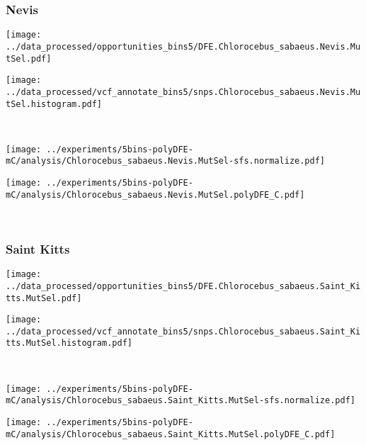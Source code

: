\subsubsection{Nevis}

\begin{minipage}{0.49\linewidth}
    \texttt{[image: ../data\_processed/opportunities\_bins5/DFE.Chlorocebus\_sabaeus.Nevis.MutSel.pdf]}
\end{minipage}
\begin{minipage}{0.49\linewidth}
    \texttt{[image: ../data\_processed/vcf\_annotate\_bins5/snps.Chlorocebus\_sabaeus.Nevis.MutSel.histogram.pdf]}
\end{minipage}
\\
\begin{minipage}{0.49\linewidth}
    \texttt{[image: ../experiments/5bins-polyDFE-mC/analysis/Chlorocebus\_sabaeus.Nevis.MutSel-sfs.normalize.pdf]}
\end{minipage}
\begin{minipage}{0.49\linewidth}
    \texttt{[image: ../experiments/5bins-polyDFE-mC/analysis/Chlorocebus\_sabaeus.Nevis.MutSel.polyDFE\_C.pdf]}
\end{minipage}
\\

\subsubsection{Saint Kitts}

\begin{minipage}{0.49\linewidth}
    \texttt{[image: ../data\_processed/opportunities\_bins5/DFE.Chlorocebus\_sabaeus.Saint\_Kitts.MutSel.pdf]}
\end{minipage}
\begin{minipage}{0.49\linewidth}
    \texttt{[image: ../data\_processed/vcf\_annotate\_bins5/snps.Chlorocebus\_sabaeus.Saint\_Kitts.MutSel.histogram.pdf]}
\end{minipage}
\\
\begin{minipage}{0.49\linewidth}
    \texttt{[image: ../experiments/5bins-polyDFE-mC/analysis/Chlorocebus\_sabaeus.Saint\_Kitts.MutSel-sfs.normalize.pdf]}
\end{minipage}
\begin{minipage}{0.49\linewidth}
    \texttt{[image: ../experiments/5bins-polyDFE-mC/analysis/Chlorocebus\_sabaeus.Saint\_Kitts.MutSel.polyDFE\_C.pdf]}
\end{minipage}
\\

